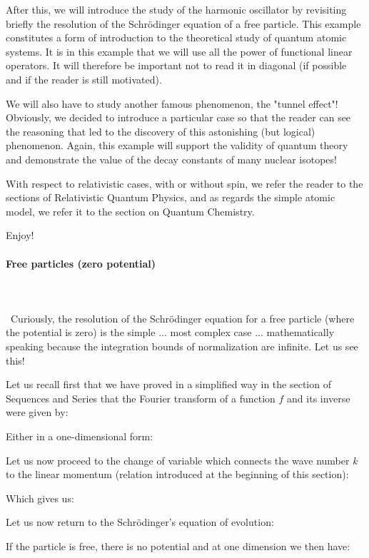 	After this, we will introduce the study of the harmonic oscillator by revisiting briefly the resolution of the Schrödinger equation of a free particle. This example constitutes a form of introduction to the theoretical study of quantum atomic systems. It is in this example that we will use all the power of functional linear operators. It will therefore be important not to read it in diagonal (if possible and if the reader is still motivated).

	We will also have to study another famous phenomenon, the "tunnel effect"! Obviously, we decided to introduce a particular case so that the reader can see the reasoning that led to the discovery of this astonishing (but logical) phenomenon. Again, this example will support the validity of quantum theory and demonstrate the value of the decay constants of many nuclear isotopes!

	With respect to relativistic cases, with or without spin, we refer the reader to the sections of Relativistic Quantum Physics, and as regards the simple atomic model, we refer it to the section on Quantum Chemistry.

	Enjoy!
	
	\paragraph{Free particles (zero potential)}\label{free particles}\mbox{}\\\\\
	Curiously, the resolution of the Schrödinger equation for a free particle (where the potential is zero) is the simple ... most complex case ... mathematically speaking because the integration bounds of normalization are infinite. Let us see this!

Let us recall first that we have proved in a simplified way in the section of Sequences and Series that the Fourier transform of a function $f$ and its inverse were given by:
	
	Either in a one-dimensional form:
	
	Let us now proceed to the change of variable which connects the wave number $k$ to the linear momentum (relation introduced at the beginning of this section):
	
	Which gives us:
	
	Let us now return to the Schrödinger's equation of evolution:
	
	If the particle is free, there is no potential and at one dimension we then have:
	
